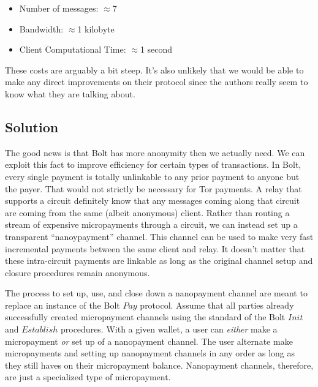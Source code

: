 \documentclass{article}
\begin{document}
\begin{itemize}
  \item Number of messages: $\approx$7
  \item Bandwidth: $\approx$1 kilobyte
  \item Client Computational Time: $\approx$1 second
\end{itemize}


These costs are arguably a bit steep. It's also unlikely that we would be able to make any direct improvements on their protocol since the authors really seem to know what they are talking about.

\subsection{Solution} The good news is that Bolt has more anonymity then we actually need. We can exploit this fact to improve efficiency for certain types of transactions. In Bolt, every single payment is totally unlinkable to any prior payment to anyone but the payer. That would not strictly be necessary for Tor payments. A relay that supports a circuit definitely know that any messages coming along that circuit are coming from the same (albeit anonymous) client. Rather than routing a stream of expensive micropayments through a circuit, we can instead set up a transparent ``nanoypayment'' channel. This channel can be used to make very fast incremental payments between the same client and relay. It doesn't matter that these intra-circuit payments are linkable as long as the original channel setup and closure procedures remain anonymous.

The process to set up, use, and close down a nanopayment channel are meant to replace an instance of the Bolt $Pay$ protocol. Assume that all parties already successfully created micropayment channels using the standard of the Bolt $Init$ and $Establish$ procedures. With a given wallet, a user can \emph{either} make a micropayment \emph{or} set up of a nanopayment channel. The user alternate make micropayments and setting up nanopayment channels in any order as long as they still haves on their micropayment balance. Nanopayment channels, therefore, are just a specialized type of micropayment.
\end{document}
